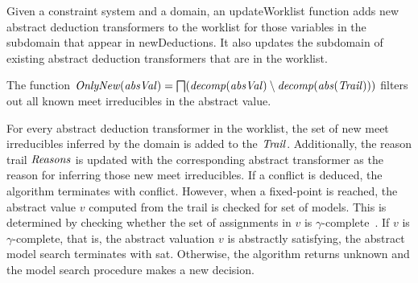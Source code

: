 Given a constraint system and a domain, an updateWorklist function adds 
new abstract deduction transformers to the worklist for those variables in 
the subdomain that appear in newDeductions.  It also updates the subdomain of 
existing abstract deduction transformers that are in the worklist. 

The function
$\mathit{OnlyNew}(\mathit{absVal})=\bigsqcap({\mathit{decomp}}(\mathit{absVal})\setminus{\mathit{decomp}}(\mathit{abs}(\mathit{Trail})))$
filters out all known meet irreducibles in the abstract value.

For every abstract deduction transformer in the worklist, 
the set of new meet irreducibles inferred by the domain is added 
to the $\mathit{Trail}$.  Additionally, the reason trail $\mathit{Reasons}$ is 
updated with the corresponding abstract transformer as the reason for inferring 
those new meet irreducibles.  If a conflict is deduced, 
the algorithm terminates with \textsf{conflict}.  However,
when a fixed-point is reached, the abstract value $v$ computed from 
the trail is checked for set of models.  This is determined by 
checking whether the set of assignments in $v$ is 
$\gamma$-complete~\cite{dhk2013-popl}. If $v$ is $\gamma$-complete, that is, the 
abstract valuation $v$ is abstractly satisfying, the abstract model search 
terminates with \textsf{sat}.  Otherwise, the algorithm returns \textsf{unknown} and the 
model search procedure makes a new decision.    
